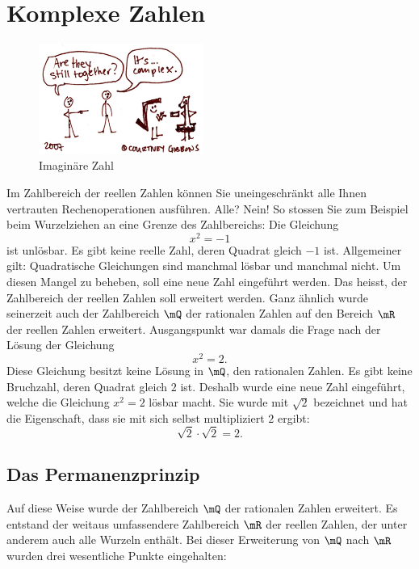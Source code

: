 \documentclass[%
11pt,%
twoside,%
titlepage,%
german,%
headsepline%
]{scrartcl}
\begin{document}
\section{Komplexe Zahlen}
\begin{figure}
\vspace{-22pt}
\begin{center}
\includegraphics[width=0.48\textwidth]{pictures/itscomplex}
\caption{Imaginäre Zahl}
\end{center}
\end{figure}
Im Zahlbereich der reellen Zahlen k\"onnen Sie uneingeschränkt alle Ihnen vertrauten Rechenoperationen ausf\"uhren. Alle? Nein! So stossen Sie zum Beispiel beim Wurzelziehen an eine Grenze des Zahlbereichs: Die Gleichung
$$x^2 = -1$$
ist unl\"osbar. Es gibt keine reelle Zahl, deren Quadrat gleich $-1$ ist. Allgemeiner gilt: Quadratische Gleichungen sind manchmal l\"osbar und manchmal nicht.
Um diesen Mangel zu beheben, soll eine neue Zahl eingef\"uhrt werden. Das heisst, der Zahlbereich der reellen Zahlen soll erweitert werden. Ganz ähnlich wurde seinerzeit auch der Zahlbereich $\mQ$ der rationalen Zahlen auf den Bereich $\mR$ der reellen Zahlen erweitert.
Ausgangspunkt war damals die Frage nach der L\"osung der Gleichung
$$x^2 = 2.$$
Diese Gleichung besitzt keine L\"osung in $\mQ$, den rationalen Zahlen. Es gibt keine Bruchzahl, deren Quadrat gleich $2$ ist. Deshalb wurde eine neue Zahl eingef\"uhrt, welche die Gleichung $x^2 = 2$ l\"osbar macht. Sie wurde mit $\sqrt{2}$ bezeichnet und hat die Eigenschaft, dass sie mit sich selbst multipliziert $2$ ergibt:
$$\sqrt{2}\cdot\sqrt{2}=2.$$

\subsection{Das Permanenzprinzip}

Auf diese Weise wurde der Zahlbereich $\mQ$ der rationalen Zahlen erweitert. Es entstand der weitaus umfassendere Zahlbereich $\mR$ der reellen Zahlen, der unter anderem auch alle Wurzeln enthält. Bei dieser Erweiterung von $\mQ$ nach $\mR$ wurden drei wesentliche Punkte eingehalten:
\end{document}
